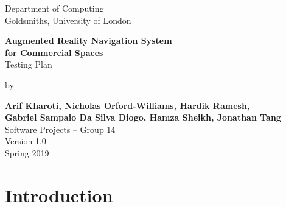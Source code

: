 \documentclass[12pt]{article}
\begin{document}
\begin{titlepage}
    \begin{center}
        \vspace*{1cm}
        Department of Computing\\
        Goldsmiths, University of London\\

        \vspace*{3.25cm}

        \textbf{\LARGE Augmented Reality Navigation System\\}
        \vspace*{0.20cm}           
        \textbf{\LARGE for Commercial Spaces}\\
        \vspace*{0.55cm}           
        {\large Testing Plan}\\
        \vspace*{0.15cm}           

        \vspace*{2cm}
        by\\
        \vspace*{0.25cm}   

        \textbf{Arif Kharoti, Nicholas Orford-Williams, Hardik Ramesh,\\}
        \textbf{Gabriel Sampaio Da Silva Diogo, Hamza Sheikh, Jonathan Tang\\}
        \vspace*{0.1cm}    
        Software Projects – Group 14\\  

        \vspace{2cm}
        Version 1.0\\
        Spring 2019
        \vfill


        \vspace{1.5cm}

    \end{center}
\end{titlepage}


\section{Introduction}
\end{document}
